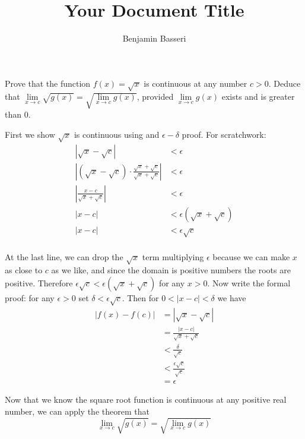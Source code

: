 \documentclass{article}
\title{Your Document Title}
\author{Benjamin Basseri}
\begin{document}
\maketitle
\begin{problem}
Prove that the function $f(x) = \sqrt{x}$ is continuous at any number $c > 0$. Deduce that $\lim\limits_{x\to c}\sqrt{g(x)} = \sqrt{\lim\limits_{x \to c} g(x)}$, provided $\lim\limits_{x \to c} g(x)$ exists and is greater than 0.
\end{problem}

First we show $\sqrt{x}$ is continuous using and $\epsilon-\delta$ proof. For scratchwork:
\begin{align*}
  |\sqrt{x} - \sqrt{c} |                                                       & < \epsilon                      \\
  |(\sqrt{x} - \sqrt{c})\cdot \frac{\sqrt{x} + \sqrt{c}}{\sqrt{x} + \sqrt{c}}| & < \epsilon                      \\
  |\frac{x - c}{\sqrt{x} + \sqrt{c}}|                                          & < \epsilon                      \\
  |x - c|                                                                      & < \epsilon(\sqrt{x} + \sqrt{c}) \\
  |x - c|                                                                      & < \epsilon\sqrt{c}              \\
\end{align*}

At the last line, we can drop the $\sqrt{x}$ term multiplying $\epsilon$ because we can make $x$ as close to $c$ as we like, and since the domain is positive numbers the roots are positive. Therefore $\epsilon\sqrt{c} < \epsilon(\sqrt{x} + \sqrt{c})$ for any $x > 0$. Now write the formal proof: for any $\epsilon > 0$ set $\delta < \epsilon\sqrt{c}$. Then for $0 < |x - c| < \delta$ we have
\begin{align*}
  |f(x) - f(c)| & = |\sqrt{x} - \sqrt{c}|               \\
                & = \frac{|x - c|}{\sqrt{x} + \sqrt{c}} \\
                & < \frac{\delta}{\sqrt{c}}             \\
                & < \frac{\epsilon\sqrt{c}}{\sqrt{c}}   \\
                & = \epsilon
\end{align*}

Now that we know the square root function is continuous at any positive real number, we can apply the theorem that
$$\lim_{x \to c} \sqrt{g(x)} = \sqrt{\lim_{x \to c} g(x)}$$
\end{document}
